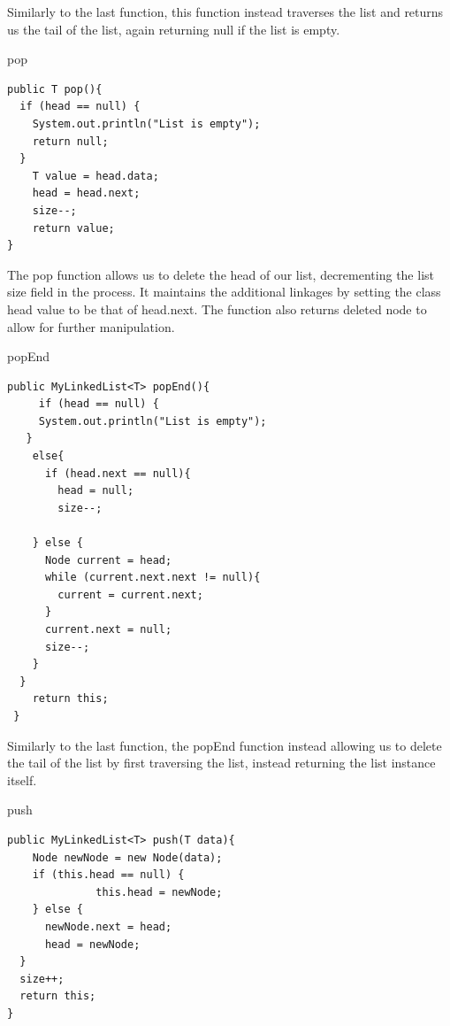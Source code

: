 \documentclass[a4paper]{article}
\begin{document}
Similarly to the last function, this function instead traverses the 
list and returns us the tail of the list, again returning null if 
the list is empty.



\begin{algorithm}
\caption{pop}\label{euclid}

\begin{verbatim}
public T pop(){
  if (head == null) {
    System.out.println("List is empty");
    return null;
  }
    T value = head.data;
    head = head.next;
    size--;
    return value;
}
\end{verbatim}

\end{algorithm}


The pop function allows us to delete the head of our list, 
decrementing the list size field in the process. 
It maintains the additional linkages by setting the class
head value to be that of head.next. The function also returns 
deleted node to allow for further manipulation.

\pagebreak

\begin{algorithm}
\caption{popEnd}\label{euclid}

\begin{verbatim}
public MyLinkedList<T> popEnd(){
     if (head == null) {
     System.out.println("List is empty");  
   }
    else{
      if (head.next == null){
        head = null;
        size--;
        
    } else {
      Node current = head;
      while (current.next.next != null){
        current = current.next;
      }
      current.next = null;
      size--;
    }
  }
    return this;
 }
\end{verbatim}

\end{algorithm}


Similarly to the last function, the popEnd function instead allowing
us to delete the tail of the list by first traversing the list,
instead returning the list instance itself.



\begin{algorithm}
\caption{push}\label{euclid}

\begin{verbatim}
public MyLinkedList<T> push(T data){
    Node newNode = new Node(data);
    if (this.head == null) {
              this.head = newNode;
    } else {
      newNode.next = head;
      head = newNode;
  }
  size++;
  return this;
}
\end{verbatim}

\end{algorithm}
\end{document}
